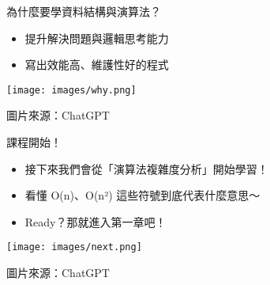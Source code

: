 \documentclass{beamer}
\begin{document}
\begin{frame}{為什麼要學資料結構與演算法？}
\begin{itemize}
    \item 提升解決問題與邏輯思考能力
    \item 寫出效能高、維護性好的程式
\end{itemize}

\vspace{1em}
\begin{center}
    \texttt{[image: images/why.png]}
    
    {\tiny 圖片來源：ChatGPT}
\end{center}
\end{frame}

\begin{frame}{課程開始！}
\begin{itemize}
    \item 接下來我們會從「演算法複雜度分析」開始學習！
    \item 看懂 O(n)、O(n²) 這些符號到底代表什麼意思～
    \item Ready？那就進入第一章吧！
\end{itemize}

\vspace{1em}
\begin{center}
    \texttt{[image: images/next.png]}
    
    {\tiny 圖片來源：ChatGPT}
\end{center}
\end{frame}
\end{document}
